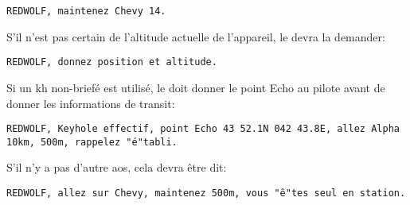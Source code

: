 \begin{e1}
	
	\begin{minipage}{\linewidth}
		
		\begin{lstlisting}[caption=Routing: maintenez, label=routingmaintain]
	REDWOLF, maintenez Chevy 14.
		\end{lstlisting}
	\end{minipage}
	
	\begin{e2}
		
		\begin{minipage}{\linewidth}
			\item S'il n'est pas certain de l'altitude actuelle de l'appareil, le \ja{} devra la demander:
			
			\begin{lstlisting}[caption=Routing: demande de position, label=routingask1]
			REDWOLF, donnez position et altitude.
			\end{lstlisting}
		\end{minipage}
		
		\begin{minipage}{\linewidth}
			\item Si un \gls{kh} non-briefé est utilisé, le \ja{} doit donner le point Echo au pilote avant de donner les informations de transit:
			
			\begin{lstlisting}[caption=Routing: keyhole, label=routinkh]
	REDWOLF, Keyhole effectif, point Echo 43 52.1N 042 43.8E, allez Alpha 10km, 500m, rappelez "é"tabli.
			\end{lstlisting}
		\end{minipage}
		
		
	\end{e2}
	
	\begin{minipage}{\linewidth}
		\item S'il n'y a pas d'autre \gls{aos}, cela devra être dit:
		
		\begin{lstlisting}[caption=Routing: pas d'autre AOS, label=routingnoaos]
	REDWOLF, allez sur Chevy, maintenez 500m, vous "ê"tes seul en station.
		\end{lstlisting}
	\end{minipage}
	

\end{e1}
